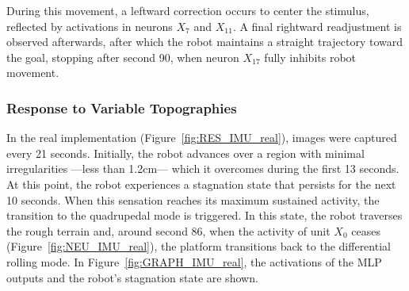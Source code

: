 \documentclass[preprint,12pt]{elsarticle}
\begin{document}
During this movement, a leftward correction occurs to center the stimulus, reflected by activations in neurons $X_7$ and $X_{11}$. A final rightward readjustment is observed afterwards, after which the robot maintains a straight trajectory toward the goal, stopping after second 90, when neuron $X_{17}$ fully inhibits robot movement. 


\subsubsection{Response to Variable Topographies}

In the real implementation (Figure~\ref{fig:RES_IMU_real}), images were captured every 21 seconds. Initially, the robot advances over a region with minimal irregularities ---less than 1.2cm--- which it overcomes during the first 13 seconds. At this point, the robot experiences a stagnation state that persists for the next 10 seconds. When this sensation reaches its maximum sustained activity, the transition to the quadrupedal mode is triggered. In this state, the robot traverses the rough terrain and, around second 86, when the activity of unit $X_{0}$ ceases (Figure~\ref{fig:NEU_IMU_real}), the platform transitions back to the differential rolling mode. In Figure~\ref{fig:GRAPH_IMU_real}, the activations of the MLP outputs and the robot’s stagnation state are shown.
\end{document}
